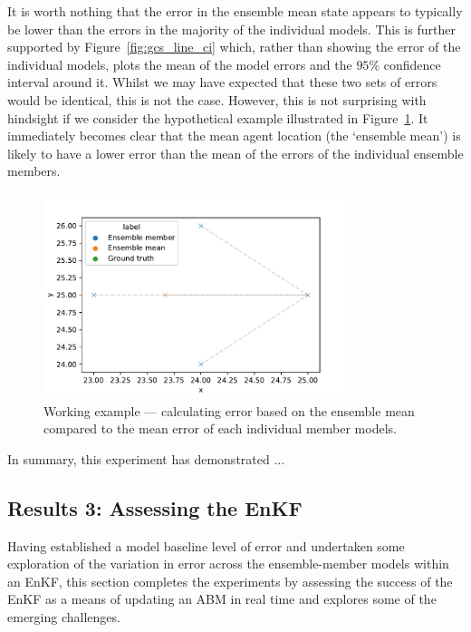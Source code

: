 \documentclass{article}
\begin{document}
It is worth nothing that the error in the ensemble mean state appears to typically be lower than the errors in the majority of the individual models. This is further supported by Figure~\ref{fig:gcs_line_ci} which, rather than showing the error of the individual models, plots the mean of the model errors and the $95\%$ confidence interval around it. Whilst we may have expected that these two sets of errors would be identical, this is not the case. However, this is not surprising with hindsight if we consider the hypothetical example illustrated in Figure~\ref{fig:gcs_working_eg}. It immediately becomes clear that the mean agent location (the `ensemble mean') is likely to have a lower error than the mean of the errors of the individual ensemble members.

\begin{figure}[ht]
	\centering
	\includegraphics[width=0.8\textwidth]{figures/exp1/working_example.pdf}
	\caption{Working example --- calculating error based on the ensemble mean compared to the mean error of each individual member models.}\label{fig:gcs_working_eg}
\end{figure}

In summary, this experiment has demonstrated ... 

\subsection{Results 3: Assessing the EnKF}

Having established a model baseline level of error and undertaken some exploration of the variation in error across the ensemble-member models within an EnKF, this section completes the experiments by assessing the success of the EnKF as a means of updating an ABM in real time and explores some of the emerging challenges. 
\end{document}
